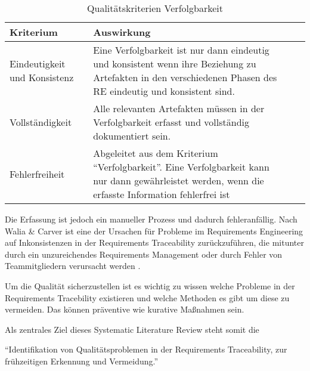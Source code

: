 \begin{table}[ht]
\centering
\begin{tabular}{p{2cm} p{5.5cm} l|l}
\rowcolor[gray] {.6} \hline
Kriterium & Auswirkung\\\hline
Eindeutigkeit und Konsistenz & Eine Verfolgbarkeit ist nur dann eindeutig und konsistent wenn ihre Beziehung zu Artefakten in den verschiedenen Phasen des RE eindeutig und konsistent sind. \\ \hline
Vollständigkeit & Alle relevanten Artefakten müssen in der Verfolgbarkeit erfasst und vollständig dokumentiert sein.  \\ \hline
Fehlerfreiheit & Abgeleitet aus dem Kriterium \enquote{Verfolgbarkeit}. Eine Verfolgbarkeit kann nur dann gewährleistet werden, wenn die erfasste Information fehlerfrei ist \\  \hline
\end{tabular}
\caption{Qualitätskriterien Verfolgbarkeit}
 \label{tab:tab1_qualitaet_verfolgbarkeit}
\end{table}

Die Erfassung ist jedoch ein manueller Prozess und dadurch fehleranfällig. Nach Walia \& Carver ist eine der Ursachen für Probleme im Requirements Engineering auf Inkonsistenzen in der Requirements Traceability zurückzuführen, die mitunter durch ein unzureichendes Requirements Management oder durch Fehler von Teammitgliedern verursacht werden \cite{Walia2009AErrors}. 

Um die Qualität sicherzustellen ist es wichtig zu wissen welche Probleme in der Requirements Tracebility existieren und welche Methoden es gibt um diese zu vermeiden.
Das können präventive wie kurative Maßnahmen sein.

Als zentrales Ziel dieses Systematic Literature Review steht somit die

\enquote{Identifikation von Qualitätsproblemen in der Requirements Traceability, zur frühzeitigen Erkennung und Vermeidung.}

